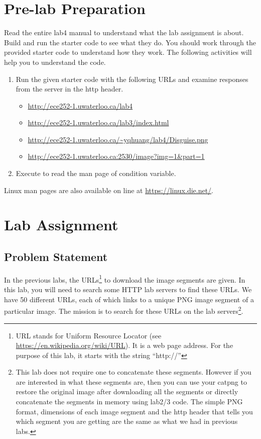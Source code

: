 \section{Pre-lab Preparation}
Read the entire lab4 manual to understand what the lab assignment is about. Build and run the starter code to see what they do. You should work through the provided starter code to understand how they work. The following activities will help you to understand the code.
\begin{enumerate}
\item Run the given starter code with the following URLs and examine responses from the server in the http header. 
  \begin{itemize}
  \item \url{http://ece252-1.uwaterloo.ca/lab4}
  \item \url{http://ece252-1.uwaterloo.ca/lab3/index.html}
  \item \url{http://ece252-1.uwaterloo.ca/~yqhuang/lab4/Disguise.png}
  \item \url{http://ece252-1.uwaterloo.ca:2530/image?img=1&part=1}
  \end{itemize}
\item Execute  to read the man page of condition variable.
\end{enumerate}
Linux man pages are also available on line at \url{https://linux.die.net/}.


\section{Lab Assignment}
\subsection{Problem Statement}
In the previous labs, the URLs\footnote{URL stands for Uniform Resource Locator (see \url{https://en.wikipedia.org/wiki/URL}). It is a web page address. For the purpose of this lab, it starts with the string ``http://''} to download the image segments are given. In this lab, you will need to search some HTTP lab servers to find these URLs. We have 50 different URLs, each of which links to a unique PNG image segment of a particular image. The mission is to search for these URLs on the lab servers\footnote{This lab does not require one to concatenate these segments. However if you are interested in what these segments are, then you can use your catpng to restore the original image after downloading all the segments or directly concatenate the segments in memory using lab2/3 code. The simple PNG format, dimensions of each image segment and the http header that tells you which segment you are getting are the same as what we had in previous labs.}.

